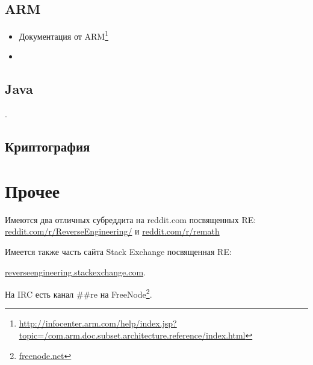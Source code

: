 \section{ARM}

\begin{itemize}
\item Документация от ARM\footnote{\AlsoAvailableAs \url{http://infocenter.arm.com/help/index.jsp?topic=/com.arm.doc.subset.architecture.reference/index.html}}

\item \ARMSixFourRefURL
\end{itemize}

\section{Java}

\JavaBook.

\section{Криптография}



\chapter{Прочее}

Имеются два отличных субреддита на reddit.com посвященных \ac{RE}:
\href{http://go.yurichev.com/17027}{reddit.com/r/ReverseEngineering/} и
\href{http://go.yurichev.com/17028}{reddit.com/r/remath}

Имеется также часть сайта Stack Exchange посвященная \ac{RE}:

\par \href{http://go.yurichev.com/17029}{reverseengineering.stackexchange.com}.

На IRC есть канал \#\#re на
FreeNode\footnote{\href{http://go.yurichev.com/17030}{freenode.net}}.

